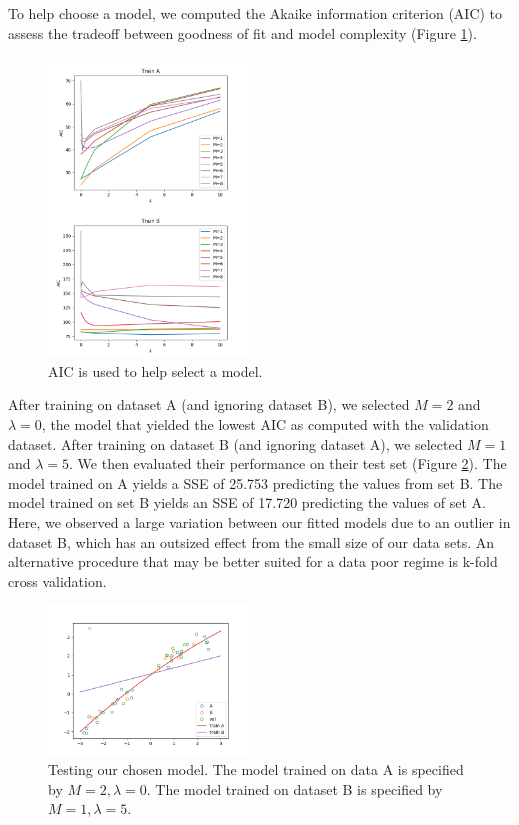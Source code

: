 \documentclass[10pt, twocolumn]{article}
\begin{document}
To help choose a model, we computed the Akaike information criterion (AIC) to assess the tradeoff between goodness of fit and model complexity (Figure \ref{fig:P3_AIC}). 

\begin{figure}
\caption{AIC is used to help select a model.}
\begin{center}
\includegraphics[width=200px]{P3_AIC}
\end{center}
\label{fig:P3_AIC}
\end{figure}

After training on dataset A (and ignoring dataset B), we selected $M=2$ and $\lambda=0$, the model that yielded the lowest AIC as computed with the validation dataset. After training on dataset B (and ignoring dataset A), we selected $M=1$ and $\lambda=5$. We then evaluated their performance on their test set (Figure \ref{fig:P3_test}). The model trained on A yields a SSE of 25.753 predicting the values from set B. The model trained on set B yields an SSE of 17.720 predicting the values of set A. Here, we observed a large variation between our fitted models due to an outlier in dataset B, which has an outsized effect from the small size of our data sets. An alternative procedure that may be better suited for a data poor regime is k-fold cross validation.

\begin{figure}
\caption{Testing our chosen model. The model trained on data A is specified by $M=2, \lambda=0$. The model trained on dataset B is specified by $M=1,\lambda=5$.}
\begin{center}
\includegraphics[width=200px]{P3_test}
\end{center}
\label{fig:P3_test}
\end{figure}
\end{document}
